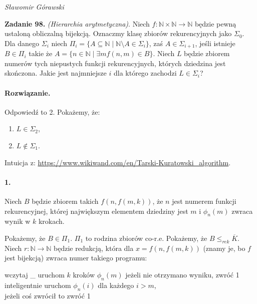 \documentclass{article}
\newcommand{\N}{\mathbb{N}}
\newcommand{\reduces}{\le_\mathit{rek}}
\renewcommand{\complement}{\overline}
\begin{document}
\begin{flushright}
\emph{Sławomir Górawski}
\end{flushright}

\noindent\textbf{Zadanie 98.}
\emph{(Hierarchia arytmetyczna)}.
Niech $f \colon \N \times \N \to \N$
będzie pewną ustaloną obliczalną bijekcją.
Oznaczmy klasę zbiorów rekurencyjnych jako $\Sigma_0$.
Dla danego $\Sigma_i$
niech $\Pi_i = \{ A \subseteq \N \mid \N \setminus A \in \Sigma_i \}$,
zaś $A \in \Sigma_{i + 1}$,
jeśli istnieje $B \in \Pi_i$
takie że $A = \{ n \in \N \mid \exists m f(n, m) \in B\}$.
Niech $L$ będzie zbiorem numerów tych niepustych funkcji rekurencyjnych,
których dziedzina jest skończona.
Jakie jest najmniejsze $i$ dla którego zachodzi $L \in \Sigma_i$?

\paragraph{Rozwiązanie.}
Odpowiedź to 2. Pokażemy, że:
\begin{enumerate}
    \item $L \in \Sigma_2$,
    \item $L \notin \Sigma_1$.
\end{enumerate}
Intuicja z:
\url{https://www.wikiwand.com/en/Tarski-Kuratowski_algorithm}.

\paragraph{1.}
Niech $B$ będzie zbiorem takich $f(n, f(m, k))$,
że $n$ jest numerem funkcji rekurencyjnej,
której największym elementem dziedziny jest $m$
i $\phi_n(m)$ zwraca wynik w $k$ krokach.

Pokażemy, że $B \in \Pi_1$.
$\Pi_1$ to rodzina zbiorów co-r.e.
Pokażemy, że $B \reduces \complement{K}$.
Niech $r \colon \N \to \N$ będzie redukcją,
która dla $x = f(n, f(m, k))$ (znamy je, bo $f$ jest bijekcją)
zwraca numer takiego programu:

\begin{algorithm}[H]
    \begin{algorithmic}[1]
        \STATE wczytaj \_
        \STATE uruchom $k$ kroków $\phi_n(m)$
        \STATE jeżeli nie otrzymano wyniku, zwróć 1
        \STATE inteligentnie uruchom $\phi_n(i)$ dla każdego $i > m$, \\
            jeżeli coś zwrócił to zwróć 1
    \end{algorithmic}
\end{algorithm}
\end{document}

